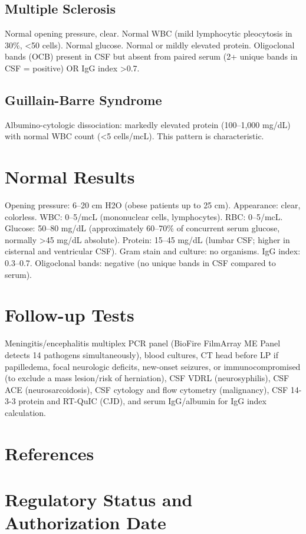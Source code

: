 \subsection*{Multiple Sclerosis}
Normal opening pressure, clear. Normal WBC (mild lymphocytic pleocytosis in 30\%, <50 cells). Normal glucose. Normal or mildly elevated protein. Oligoclonal bands (OCB) present in CSF but absent from paired serum (2+ unique bands in CSF = positive) OR IgG index >0.7.
\subsection*{Guillain-Barre Syndrome}
Albumino-cytologic dissociation: markedly elevated protein (100--1,000 mg/dL) with normal WBC count (<5 cells/mcL). This pattern is characteristic.
\section*{Normal Results}
Opening pressure: 6--20 cm H2O (obese patients up to 25 cm). Appearance: clear, colorless. WBC: 0--5/mcL (mononuclear cells, lymphocytes). RBC: 0--5/mcL. Glucose: 50--80 mg/dL (approximately 60--70\% of concurrent serum glucose, normally >45 mg/dL absolute). Protein: 15--45 mg/dL (lumbar CSF; higher in cisternal and ventricular CSF). Gram stain and culture: no organisms. IgG index: 0.3--0.7. Oligoclonal bands: negative (no unique bands in CSF compared to serum).
\section*{Follow-up Tests}
Meningitis/encephalitis multiplex PCR panel (BioFire FilmArray ME Panel detects 14 pathogens simultaneously), blood cultures, CT head before LP if papilledema, focal neurologic deficits, new-onset seizures, or immunocompromised (to exclude a mass lesion/risk of herniation), CSF VDRL (neurosyphilis), CSF ACE (neurosarcoidosis), CSF cytology and flow cytometry (malignancy), CSF 14-3-3 protein and RT-QuIC (CJD), and serum IgG/albumin for IgG index calculation.
\section*{References}



\clearpage
\section*{Regulatory Status and Authorization Date}

\clearpage
